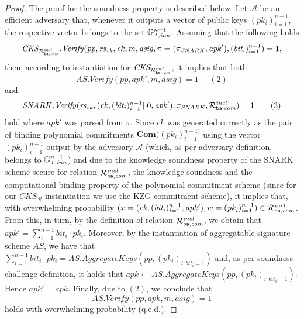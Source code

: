 \begin{proof}
\noindent The proof for the soundness property is described below. Let $\mathcal{A}$ be an efficient adversary that, 
whenever it outputs a vector of public keys $(\mathit{pk_i})_{i=1}^{n-1}$, the respective vector belongs to the set $\mathbb{G}_{\mathit{1,inn}}^{n-1}$. 
Assuming that the following holds 
$$\mathit{CKS_{\mathcal{R}^{\mathit{incl}}_{\mathsf{ba},\mathit{com}}}.Verify}(\mathit{pp}, \mathit{rs}_{\mathit{vk}}, \mathit{ck}, m, \mathit{asig}, \pi = (\pi_{\mathit{SNARK}}, \mathit{apk'}), (\mathit{bit_i})_{i=1}^{n-1}) =1,$$ 
then, according to instantiation for $\mathit{CKS_{\mathcal{R}^{\mathit{incl}}_{\mathsf{ba},\mathit{com}}}}$, it implies that both 
$$\mathit{AS.Verify(\mathit{pp}, \mathit{apk'}, m, \mathit{asig})} = 1 \ \ \ \ \ \ (2)$$ 
and 
$$\mathit{SNARK.Verify}(\mathit{rs_{vk}}, (\mathit{ck}, (\mathit{bit_i})_{i=1}^{n-1}||0, \mathit{apk'}), \pi_{\mathit{SNARK}}, \mathcal{R}^{\mathit{incl}}_{\mathsf{ba},\mathit{com}}) = 1  \ \ \ \ \ \ (3)$$
hold where $\mathit{apk'}$ was parsed from $\pi$. Since $\mathit{ck}$ was generated correctly as the pair of binding polynomial commitments 
$\mathbf{Com}((\mathit{pk_i})_{i=1}^{n-1)}$ using the vector $(\mathit{pk_i})_{i=1}^{n-1}$ output by the adversary $\mathcal{A}$ 
(which, as per adversary definition, belongs to $\mathbb{G}_{\mathit{1,inn}}^{n-1}$) and due to the knowledge 
soundness property of the SNARK scheme secure for relation $\mathcal{R}^{\mathit{incl}}_{\mathsf{ba},\mathit{com}}$, the knowledge soundness and the computational binding property 
of the polynomial commitment scheme (since for our $\mathit{CKS_{\mathcal{R}}}$ instantiation we use the KZG commitment scheme), it implies that, 
with overwhelming probability $(x = (\mathit{ck}, (\mathit{bit_i})_{i=1}^{n-1}, \mathit{apk'}), w = (\mathit{pk}_i)_{i=1}^{n-1}) \in \mathcal{R}^{\mathit{incl}}_{\mathsf{ba},\mathit{com}}$. 
From this, in turn, by the definition of relation $\mathcal{R}^{\mathit{incl}}_{\mathsf{ba},\mathit{com}}$, we obtain that 
$\mathit{apk'} = \sum_{i=1}^{n-1} \mathit{bit_i} \cdot \mathit{pk_i}$. Moreover, by the instantiation of aggregatable signature scheme 
$\mathit{AS}$, we have that $\sum_{i=1}^{n-1} \mathit{bit_i} \cdot \mathit{pk_i} = \mathit{AS.AggregateKeys}(\mathit{pp}, (\mathit{pk_i})_{i:\mathit{bit_i = 1}})$ 
and, as per soundness challenge definition, it holds that 
$\mathit{apk} \leftarrow \mathit{AS.AggregateKeys}(\mathit{pp}, (\mathit{pk_i})_{i:\mathit{bit_i = 1}})$. Hence $\mathit{apk'} = \mathit{apk}$.
Finally, due to $(2)$, we conclude that $$\mathit{AS.Verify(\mathit{pp}, \mathit{apk}, m, \mathit{asig})} = 1$$ holds with overwhelming probability (q.e.d.).

\end{proof}


